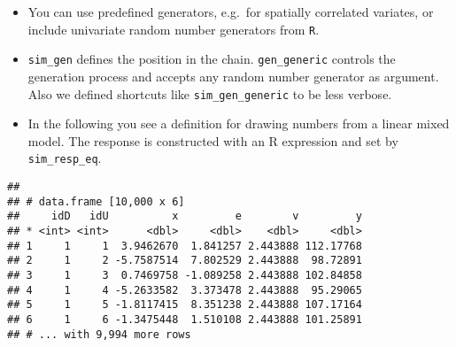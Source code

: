 \begin{itemize}
\tightlist
\item
  You can use predefined generators, e.g.~for spatially correlated
  variates, or include univariate random number generators from
  \texttt{R}.
\item
  \texttt{sim\_gen} defines the position in the chain.
  \texttt{gen\_generic} controls the generation process and accepts any
  random number generator as argument. Also we defined shortcuts like
  \texttt{sim\_gen\_generic} to be less verbose.
\item
  In the following you see a definition for drawing numbers from a
  linear mixed model. The response is constructed with an R expression
  and set by \texttt{sim\_resp\_eq}.
\end{itemize}

\begin{Shaded}
\end{Shaded}

\begin{verbatim}
## 
## # data.frame [10,000 x 6]
##     idD   idU          x         e        v         y
## * <int> <int>      <dbl>     <dbl>    <dbl>     <dbl>
## 1     1     1  3.9462670  1.841257 2.443888 112.17768
## 2     1     2 -5.7587514  7.802529 2.443888  98.72891
## 3     1     3  0.7469758 -1.089258 2.443888 102.84858
## 4     1     4 -5.2633582  3.373478 2.443888  95.29065
## 5     1     5 -1.8117415  8.351238 2.443888 107.17164
## 6     1     6 -1.3475448  1.510108 2.443888 101.25891
## # ... with 9,994 more rows
\end{verbatim}
